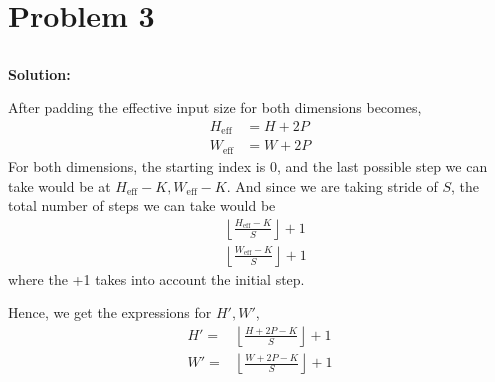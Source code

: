 \documentclass{article}
\newenvironment{solution}
  {\par\noindent\textbf{Solution:}\par}
  {\par}
\begin{document}
\section{Problem 3}

\subsection{} 
\begin{solution}
 After padding the effective input size for both dimensions becomes, 
 \[ 
   \begin{aligned}
     H_{\text{eff}} &= H + 2P \\ 
     W_{\text{eff}} &= W +2P
   \end{aligned}
   \]
  For both dimensions, the starting index is 0, and the last possible step we can take would be at $H_\text{eff} - K, W_\text{eff} -K $. 
  And since we are taking stride of $S$, the total number of steps we can take would be 
  \[
  \begin{aligned}
    &\left\lfloor \frac{H_\text{eff} - K}{S}\right\rfloor + 1 \\ 
    &\left\lfloor\frac{W_\text{eff} -K}{S}\right\rfloor + 1
  \end{aligned}
  \]
  where the +1 takes into account the initial step.

  Hence, we get the expressions for $H',W'$, 
  \[
    \begin{aligned}
      H' = &\left\lfloor \frac{H + 2P  - K}{S} \right\rfloor + 1 \\ 
     W' = &\left\lfloor\frac{W + 2P -K}{S}\right\rfloor + 1
    \end{aligned}
  \]
\end{solution}
\end{document}
